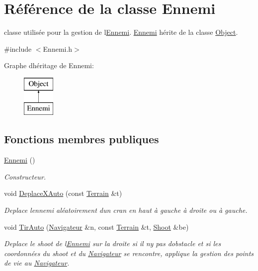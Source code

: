 \hypertarget{class_ennemi}{}\section{Référence de la classe Ennemi}
\label{class_ennemi}


classe utilisée pour la gestion de l\textquotesingle{}\hyperlink{class_ennemi}{Ennemi}. \hyperlink{class_ennemi}{Ennemi} hérite de la classe \hyperlink{class_object}{Object}.  




{\ttfamily \#include $<$Ennemi.\+h$>$}

Graphe d\textquotesingle{}héritage de Ennemi\+:\begin{figure}[H]
\begin{center}
\leavevmode
\includegraphics[height=2.000000cm]{class_ennemi}
\end{center}
\end{figure}
\subsection*{Fonctions membres publiques}
\begin{DoxyCompactItemize}
\item 
\hyperlink{class_ennemi_a9c5eb7ca82848b97f3dcf262fe625b3a}{Ennemi} ()
\begin{DoxyCompactList}\small\item\em Constructeur. \end{DoxyCompactList}\item 
void \hyperlink{class_ennemi_a649379ddaf7698276d924f48d56d87c5}{Deplace\+X\+Auto} (const \hyperlink{class_terrain}{Terrain} \&t)
\begin{DoxyCompactList}\small\item\em Deplace l\textquotesingle{}ennemi aléatoirement d\textquotesingle{}un cran en haut à gauche à droite ou à gauche. \end{DoxyCompactList}\item 
void \hyperlink{class_ennemi_a248d1bb99ad000f7dabbef353086ab1e}{Tir\+Auto} (\hyperlink{class_navigateur}{Navigateur} \&n, const \hyperlink{class_terrain}{Terrain} \&t, \hyperlink{class_shoot}{Shoot} \&be)
\begin{DoxyCompactList}\small\item\em Deplace le shoot de l\textquotesingle{}\hyperlink{class_ennemi}{Ennemi} sur la droite si il n\textquotesingle{}y pas d\textquotesingle{}obstacle et si les coordonnées du shoot et du \hyperlink{class_navigateur}{Navigateur} se rencontre, applique la gestion des points de vie au \hyperlink{class_navigateur}{Navigateur}. \end{DoxyCompactList}\end{DoxyCompactItemize}



